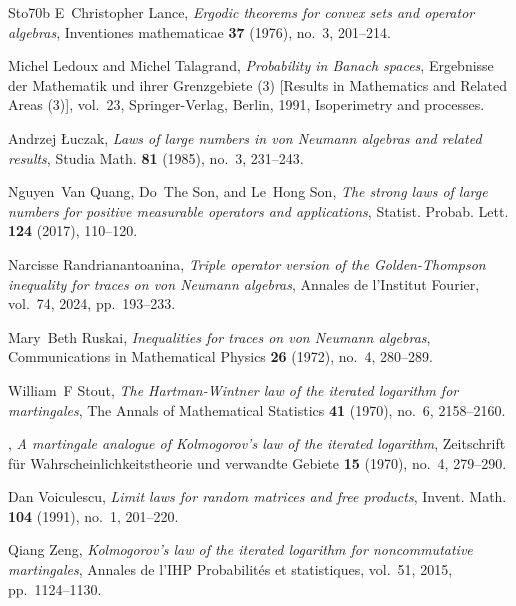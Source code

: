 \documentclass[10pt]{amsart}
\theoremstyle{definition}
\theoremstyle{myremark}
\numberwithin{equation}{section}
\begin{document}
\begin{thebibliography}{Sto70b}
E~Christopher Lance, \emph{Ergodic theorems for convex sets and operator algebras}, Inventiones mathematicae \textbf{37} (1976), no.~3, 201--214.

Michel Ledoux and Michel Talagrand, \emph{Probability in {B}anach spaces}, Ergebnisse der Mathematik und ihrer Grenzgebiete (3) [Results in Mathematics and Related Areas (3)], vol.~23, Springer-Verlag, Berlin, 1991, Isoperimetry and processes. 

Andrzej {\L}uczak, \emph{Laws of large numbers in von {N}eumann algebras and related results}, Studia Math. \textbf{81} (1985), no.~3, 231--243. 

Nguyen~Van Quang, Do~The Son, and Le~Hong Son, \emph{The strong laws of large numbers for positive measurable operators and applications}, Statist. Probab. Lett. \textbf{124} (2017), 110--120. 

Narcisse Randrianantoanina, \emph{Triple operator version of the {G}olden-{T}hompson inequality for traces on von {N}eumann algebras}, Annales de l'Institut Fourier, vol.~74, 2024, pp.~193--233.

Mary~Beth Ruskai, \emph{Inequalities for traces on von {N}eumann algebras}, Communications in Mathematical Physics \textbf{26} (1972), no.~4, 280--289.

William~F Stout, \emph{The {H}artman-{W}intner law of the iterated logarithm for martingales}, The Annals of Mathematical Statistics \textbf{41} (1970), no.~6, 2158--2160.

\bysame, \emph{A martingale analogue of {K}olmogorov's law of the iterated logarithm}, Zeitschrift f{\"u}r Wahrscheinlichkeitstheorie und verwandte Gebiete \textbf{15} (1970), no.~4, 279--290.

Dan Voiculescu, \emph{Limit laws for random matrices and free products}, Invent. Math. \textbf{104} (1991), no.~1, 201--220. 

Qiang Zeng, \emph{Kolmogorov’s law of the iterated logarithm for noncommutative martingales}, Annales de l'IHP Probabilit{\'e}s et statistiques, vol.~51, 2015, pp.~1124--1130.

\end{thebibliography}
\end{document}
